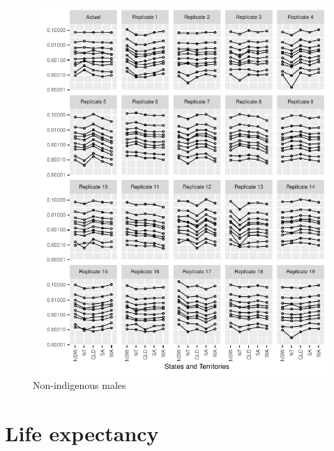 \documentclass{article}
\begin{document}
\begin{figure}
  \centering
  \includegraphics{out/fig_replicate_data_Male_Non-Indigenous_Baseline}
 \caption{Non-indigenous males}
\end{figure}
\newpage


\clearpage
\section{Life expectancy}
\newpage
\end{document}
